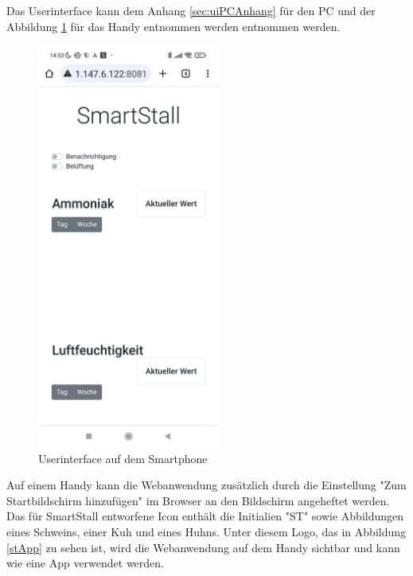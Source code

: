 \documentclass[conference]{IEEEtran}
\begin{document}
Das Userinterface kann dem Anhang \ref{sec:uiPCAnhang} für den PC und der Abbildung \ref{uiHandy} für das Handy entnommen werden entnommen werden. 
\begin{figure}[H]
	\centering
	\includegraphics[width=60mm]{fig/uiHandy.jpg}
	\caption{Userinterface auf dem Smartphone}
	\label{uiHandy}
\end{figure}
Auf einem Handy kann die Webanwendung zusätzlich durch die Einstellung "Zum Startbildschirm hinzufügen" im Browser an den Bildschirm angeheftet werden. Das für SmartStall entworfene Icon enthält die Initialien "ST" sowie Abbildungen eines Schweins, einer Kuh und eines Huhns. Unter diesem Logo, das in Abbildung \ref{stApp} zu sehen ist, wird die Webanwendung auf dem Handy sichtbar und kann wie eine App verwendet werden.
\end{document}
